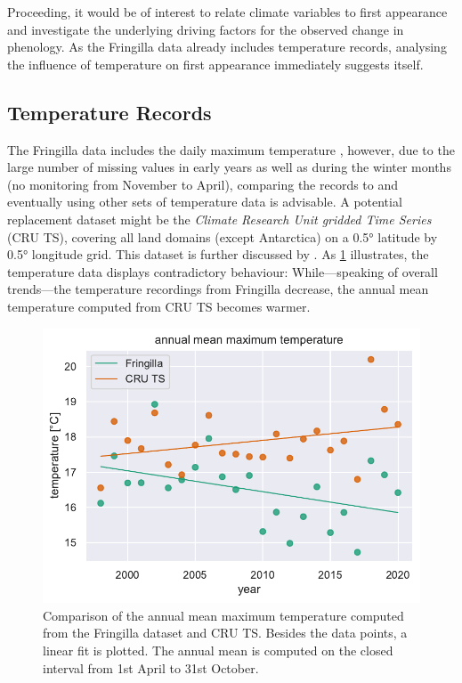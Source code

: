 Proceeding, it would be of interest to relate climate variables to first appearance and investigate the underlying driving factors for the observed change in phenology. As the Fringilla data already includes temperature records, analysing the influence of temperature on first appearance immediately suggests itself.

\subsection{Temperature Records}

The Fringilla data includes the daily maximum temperature \parencite{shapoval2012}, however, due to the large number of missing values in early years as well as during the winter months (no monitoring from November to April), comparing the records to and eventually using other sets of temperature data is advisable. A potential replacement dataset might be the \textit{Climate Research Unit gridded Time Series} (CRU TS), covering all land domains (except Antarctica) on a \ang{0.5} latitude by \ang{0.5} longitude grid. This dataset is further discussed by \textcite{harris2020}.
As \cref{fig:annual-mean-tmp} illustrates, the temperature data displays contradictory behaviour: While---speaking of overall trends---the temperature recordings from Fringilla decrease, the annual mean temperature computed from CRU TS becomes warmer. 

\begin{figure}[H]
	\centering
	\includegraphics[width=0.9\linewidth]{figs/annual-mean-tmp-comparison}
	\caption{Comparison of the annual mean maximum temperature computed from the Fringilla dataset and CRU TS. Besides the data points, a linear fit is plotted. The annual mean is computed on the closed interval from 1st April to 31st October.}
	\label{fig:annual-mean-tmp}
\end{figure}

